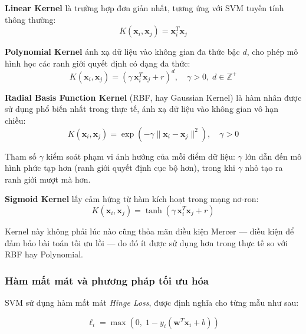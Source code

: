 \textbf{Linear Kernel} là trường hợp đơn giản nhất, tương ứng với SVM tuyến tính thông thường:
\begin{equation}
  K(\mathbf{x}_i, \mathbf{x}_j) = \mathbf{x}_i^T \mathbf{x}_j
  \label{eq:linear_kernel}
\end{equation}

\textbf{Polynomial Kernel} ánh xạ dữ liệu vào không gian đa thức bậc $d$, cho phép mô hình học các ranh giới quyết định có dạng đa thức:
\begin{equation}
  K(\mathbf{x}_i, \mathbf{x}_j)
  = \left(\gamma\, \mathbf{x}_i^T \mathbf{x}_j + r\right)^d,
  \quad \gamma > 0,\; d \in \mathbb{Z}^+
  \label{eq:poly_kernel}
\end{equation}

\textbf{Radial Basis Function Kernel} (RBF, hay Gaussian Kernel) là hàm nhân được sử dụng phổ biến nhất trong thực tế, ánh xạ dữ liệu vào không gian vô hạn chiều:
\begin{equation}
  K(\mathbf{x}_i, \mathbf{x}_j)
  = \exp\!\left(-\gamma \|\mathbf{x}_i - \mathbf{x}_j\|^2\right),
  \quad \gamma > 0
  \label{eq:rbf_kernel}
\end{equation}

\noindent Tham số $\gamma$ kiểm soát phạm vi ảnh hưởng của mỗi điểm dữ liệu: $\gamma$ lớn dẫn đến mô hình phức tạp hơn (ranh giới quyết định cục bộ hơn), trong khi $\gamma$ nhỏ tạo ra ranh giới mượt mà hơn.

\textbf{Sigmoid Kernel} lấy cảm hứng từ hàm kích hoạt trong mạng nơ-ron:
\begin{equation}
  K(\mathbf{x}_i, \mathbf{x}_j)
  = \tanh\!\left(\gamma\, \mathbf{x}_i^T \mathbf{x}_j + r\right)
  \label{eq:sigmoid_kernel}
\end{equation}

\noindent Kernel này không phải lúc nào cũng thỏa mãn điều kiện Mercer --- điều kiện để đảm bảo bài toán tối ưu lồi --- do đó ít được sử dụng hơn trong thực tế so với RBF hay Polynomial.

\subsubsection{Hàm mất mát và phương pháp tối ưu hóa}

SVM sử dụng hàm mất mát \textit{Hinge Loss}, được định nghĩa cho từng mẫu như sau:

\begin{equation}
  \ell_i = \max\!\left(0,\; 1 - y_i\!\left(\mathbf{w}^T \mathbf{x}_i + b\right)\right)
  \label{eq:hinge}
\end{equation}

